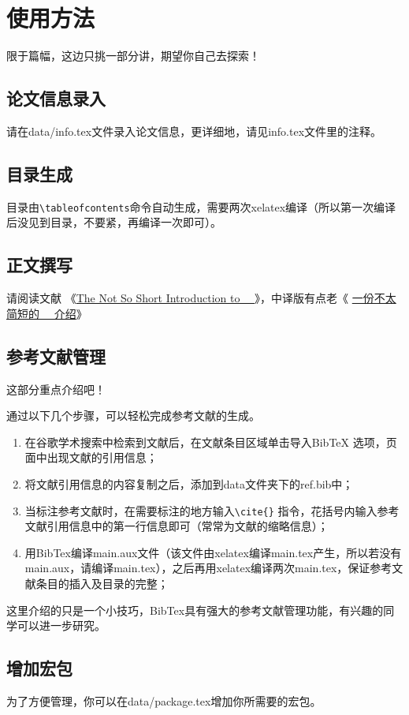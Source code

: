 \chapter{使用方法}
限于篇幅，这边只挑一部分讲，期望你自己去探索！
\section{论文信息录入}
请在data/info.tex文件录入论文信息，更详细地，请见info.tex文件里的注释。
\section{目录生成}
目录由\verb|\tableofcontents|命令自动生成，需要两次xelatex编译（所以第一次编译后没见到目录，不要紧，再编译一次即可）。
\section{正文撰写}
请阅读文献 《\href{http://mirrors.ustc.edu.cn/CTAN/info/lshort/english/lshort.pdf}{The Not So Short Introduction to ~\LaTeXe{}~}》\cite{oetiker1995not}，中译版有点老《 \href{http://mirrors.hustunique.com/CTAN/info/lshort/chinese/lshort-zh-cn.pdf}{一份不太简短的~\LaTeXe{}~ 介绍}》
\section{参考文献管理}
这部分重点介绍吧！\par
通过以下几个步骤，可以轻松完成参考文献的生成。\par
\begin{enumerate}
  \item 在谷歌学术搜索中检索到文献后，在文献条目区域单击导入BibTeX 选项，页面中出现文献的引用信息；
  \item 将文献引用信息的内容复制之后，添加到data文件夹下的ref.bib中；
  \item 当标注参考文献时，在需要标注的地方输入\verb|\cite{}| 指令，花括号内输入参考文献引用信息中的第一行信息即可（常常为文献的缩略信息）；
  \item 用BibTex编译main.aux文件（该文件由xelatex编译main.tex产生，所以若没有main.aux，请编译main.tex），之后再用xelatex编译两次main.tex，保证参考文献条目的插入及目录的完整；
\end{enumerate}
\par
这里介绍的只是一个小技巧，BibTex具有强大的参考文献管理功能，有兴趣的同学可以进一步研究。
\section{增加宏包}
为了方便管理，你可以在data/package.tex增加你所需要的宏包。
